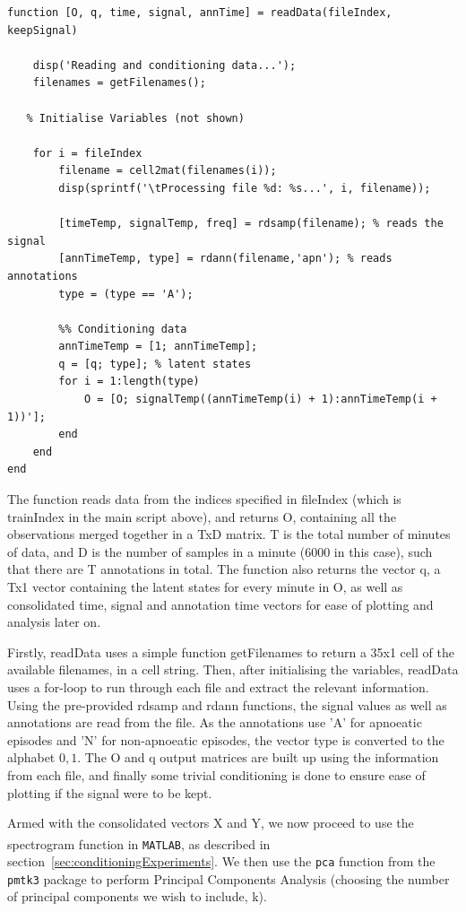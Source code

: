 \begin{lstlisting}
function [O, q, time, signal, annTime] = readData(fileIndex, keepSignal)

    disp('Reading and conditioning data...');
    filenames = getFilenames();

   % Initialise Variables (not shown)

    for i = fileIndex
        filename = cell2mat(filenames(i));
        disp(sprintf('\tProcessing file %d: %s...', i, filename));
        
        [timeTemp, signalTemp, freq] = rdsamp(filename); % reads the signal
        [annTimeTemp, type] = rdann(filename,'apn'); % reads annotations
        type = (type == 'A');

        %% Conditioning data
        annTimeTemp = [1; annTimeTemp];
        q = [q; type]; % latent states
        for i = 1:length(type)
            O = [O; signalTemp((annTimeTemp(i) + 1):annTimeTemp(i + 1))'];
        end
    end
end
\end{lstlisting}

The function reads data from the indices specified in fileIndex (which is trainIndex in the main script above), and returns O, containing all the observations merged together in a TxD matrix. T is the total number of minutes of data, and D is the number of samples in a minute (6000 in this case), such that there are T annotations in total. The function also returns the vector q, a Tx1 vector containing the latent states for every minute in O, as well as consolidated time, signal and annotation time vectors for ease of plotting and analysis later on.

Firstly, readData uses a simple function getFilenames to return a 35x1 cell of the available filenames, in a cell string. Then, after initialising the variables, readData uses a for-loop to run through each file and extract the relevant information. Using the pre-provided rdsamp and rdann functions, the signal values as well as annotations are read from the file. As the annotations use 'A' for apnoeatic episodes and 'N' for non-apnoeatic episodes, the vector type is converted to the alphabet ${0,1}$. The O and q output matrices are built up using the information from each file, and finally some trivial conditioning is done to ensure ease of plotting if the signal were to be kept.

Armed with the consolidated vectors X and Y, we now proceed to use the spectrogram function in \verb!MATLAB!\textsuperscript{\textregistered}, as described in section~\ref{sec:conditioningExperiments}. We then use the \verb!pca! function from the \verb!pmtk3! package to perform Principal Components Analysis (choosing the number of principal components we wish to include, k). 

